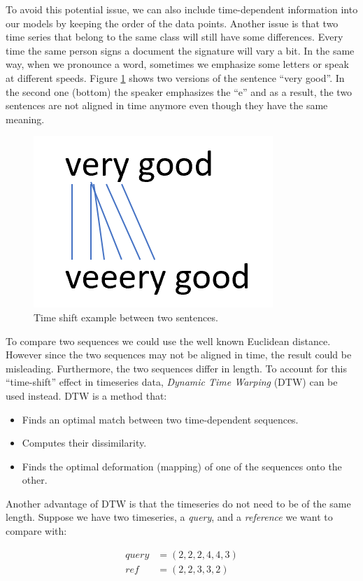 \documentclass[
  11pt,
]{krantz}
\providecommand{\tightlist}{%
  \setlength{\itemsep}{0pt}\setlength{\parskip}{0pt}}
\begin{document}
To avoid this potential issue, we can also include time-dependent information into our models by keeping the order of the data points. Another issue is that two time series that belong to the same class will still have some differences. Every time the same person signs a document the signature will vary a bit. In the same way, when we pronounce a word, sometimes we emphasize some letters or speak at different speeds. Figure \ref{fig:verygood} shows two versions of the sentence ``very good''. In the second one (bottom) the speaker emphasizes the ``e'' and as a result, the two sentences are not aligned in time anymore even though they have the same meaning.

\begin{figure}

{\centering \includegraphics[width=0.3\linewidth]{images/verygood} 

}

\caption{Time shift example between two sentences.}\label{fig:verygood}
\end{figure}

To compare two sequences we could use the well known Euclidean distance. However since the two sequences may not be aligned in time, the result could be misleading. Furthermore, the two sequences differ in length. To account for this ``time-shift'' effect in timeseries data, \emph{Dynamic Time Warping} (DTW) \citep{sakoe1990dynamic} can be used instead. DTW is a method that:

\begin{itemize}
\tightlist
\item
  Finds an optimal match between two time-dependent sequences.
\item
  Computes their dissimilarity.
\item
  Finds the optimal deformation (mapping) of one of the sequences onto the other.
\end{itemize}

Another advantage of DTW is that the timeseries do not need to be of the same length. Suppose we have two timeseries, a \emph{query}, and a \emph{reference} we want to compare with:

\begin{align*}
query&=(2,2,2,4,4,3)\\
ref&=(2,2,3,3,2)
\end{align*}
\end{document}

